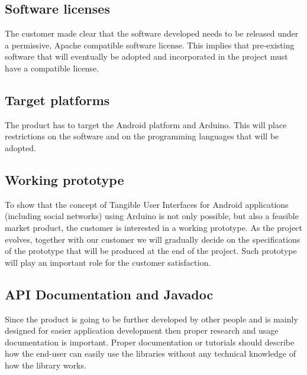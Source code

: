 \subsection{Software licenses}
The customer made clear that the software developed needs to be released
under a permissive, Apache compatible software license. This implies
that pre-existing software that will eventually be adopted and incorporated
in the project must have a compatible license.

\subsection{Target platforms}
The product has to target the Android platform and Arduino.
This will place restrictions on the software and on the programming languages that will be adopted.

\subsection{Working prototype}
To show that the concept of Tangible User Interfaces for Android applications
(including social networks) using Arduino is not only possible, but
also a feasible market product, the customer is interested in a working
prototype. As the project evolves, together with our customer we will
gradually decide on the specifications of the prototype that will
be produced at the end of the project. Such prototype will play an
important role for the customer satisfaction.

\subsection{API Documentation and Javadoc}
Since the product is going to be further developed by other people and is
mainly designed for easier application development then proper research and usage
documentation is important. Proper documentation or tutorials should describe how
the end-user can easily use the libraries without any technical knowledge of how
the library works.
